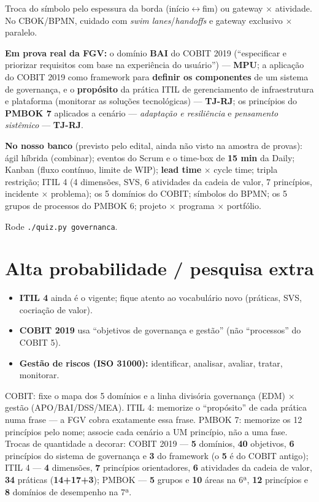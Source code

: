 \begin{pegadinha}
Troca do símbolo pelo espessura da borda (início$\leftrightarrow$fim) ou
gateway $\times$ atividade. No CBOK/BPMN, cuidado com \textit{swim
lanes}/\textit{handoffs} e gateway exclusivo $\times$ paralelo.
\end{pegadinha}

\begin{jacaiu}
\textbf{Em prova real da FGV:} o domínio \textbf{BAI} do COBIT 2019
(``especificar e priorizar requisitos com base na experiência do usuário'')
--- \textbf{MPU}; a aplicação do COBIT 2019 como framework para
\textbf{definir os componentes} de um sistema de governança, e o
\textbf{propósito} da prática ITIL de gerenciamento de infraestrutura e
plataforma (monitorar as soluções tecnológicas) --- \textbf{TJ-RJ}; os
princípios do \textbf{PMBOK 7} aplicados a cenário --- \textit{adaptação e
resiliência} e \textit{pensamento sistêmico} --- \textbf{TJ-RJ}.

\textbf{No nosso banco} (previsto pelo edital, ainda não visto na amostra de
provas): ágil híbrida (combinar); eventos do Scrum e o time-box de
\textbf{15 min} da Daily; Kanban (fluxo contínuo, limite de WIP);
\textbf{lead time} $\times$ cycle time; tripla restrição; ITIL 4 (4
dimensões, SVS, 6 atividades da cadeia de valor, 7 princípios,
incidente $\times$ problema); os 5 domínios do COBIT; símbolos do BPMN;
os 5 grupos de processos do PMBOK 6; projeto $\times$ programa $\times$
portfólio.

Rode \texttt{./quiz.py governanca}.
\end{jacaiu}

\section{Alta probabilidade / pesquisa extra}

\begin{itemize}
\item \textbf{ITIL 4} ainda é o vigente; fique atento ao vocabulário novo
(práticas, SVS, cocriação de valor).
\item \textbf{COBIT 2019} usa ``objetivos de governança e gestão'' (não
``processos'' do COBIT 5).
\item \textbf{Gestão de riscos (ISO 31000):} identificar, analisar, avaliar,
tratar, monitorar.
\end{itemize}

\begin{comosair}
COBIT: fixe o mapa dos 5 domínios e a linha divisória governança (EDM)
$\times$ gestão (APO/BAI/DSS/MEA). ITIL 4: memorize o ``propósito'' de cada
prática numa frase --- a FGV cobra exatamente essa frase. PMBOK 7: memorize
os 12 princípios pelo nome; associe cada cenário a UM princípio, não a uma
fase. Trocas de quantidade a decorar: COBIT 2019 --- \textbf{5} domínios,
\textbf{40} objetivos, \textbf{6} princípios do sistema de governança e
\textbf{3} do framework (o \textbf{5} é do COBIT antigo); ITIL 4 --- \textbf{4}
dimensões, \textbf{7} princípios orientadores, \textbf{6} atividades da cadeia
de valor, \textbf{34} práticas (\textbf{14+17+3}); PMBOK --- \textbf{5} grupos
e \textbf{10} áreas na 6ª, \textbf{12} princípios e \textbf{8} domínios de
desempenho na 7ª.
\end{comosair}
